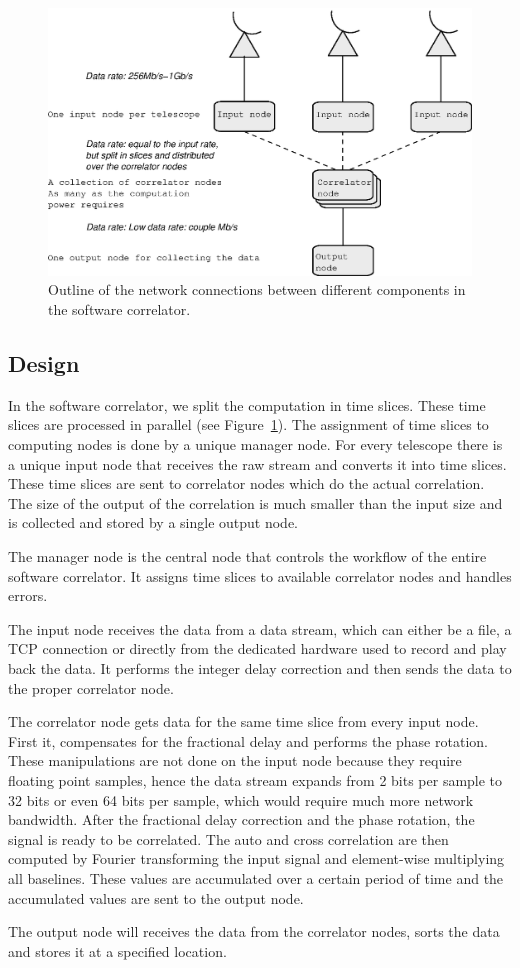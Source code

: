 \begin{figure}
  \centering
  \includegraphics[width=.75\textwidth]
    {img/Network_correlator}
    \caption{Outline of the network connections between different
      components in the software correlator.}
  \label{fig:netw_corr}
\end{figure}


\subsection{Design}
In the software correlator, we split the computation in time slices.
These time slices are processed in parallel (see
Figure~\ref{fig:netw_corr}). The assignment of time slices to
computing nodes is done by a unique manager node. For every telescope
there is a unique input node that receives the raw stream and converts
it into time slices. These time slices are sent to correlator nodes
which do the actual correlation. The size of the output of the
correlation is much smaller than the input size and is collected and
stored by a single output node.

The manager node is the central node that controls the workflow of the
entire software correlator. It assigns time slices to available
correlator nodes and handles errors.

The input node receives the data from a data stream, which can either
be a file, a TCP connection or directly from the dedicated hardware
used to record and play back the data. It performs the integer delay
correction and then sends the data to the proper correlator node.

The correlator node gets data for the same time slice from every input
node. First it, compensates for the fractional delay and performs the
phase rotation. These manipulations are not done on the input node
because they require floating point samples, hence the data stream
expands from 2 bits per sample to 32 bits or even 64 bits per sample,
which would require much more network bandwidth. After the fractional
delay correction and the phase rotation, the signal is ready to be
correlated.  The auto and cross correlation are then computed by
Fourier transforming the input signal and element-wise multiplying all
baselines. These values are accumulated over a certain period of time
and the accumulated values are sent to the output node.

The output node will receives the data from the correlator nodes,
sorts the data and stores it at a specified location.

